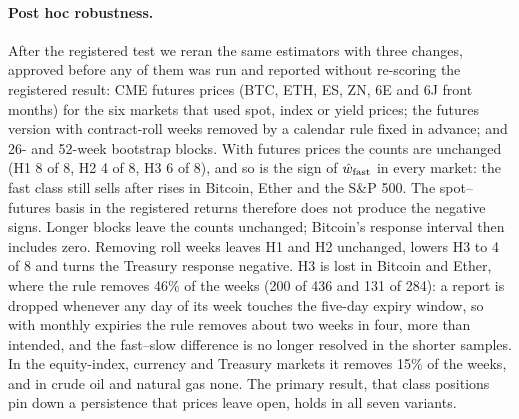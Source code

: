 \paragraph{Post hoc robustness.} After the registered test we reran the same estimators with three changes, approved before any of them was run and reported without re-scoring the registered result: CME futures prices (BTC, ETH, ES, ZN, 6E and 6J front months) for the six markets that used spot, index or yield prices; the futures version with contract-roll weeks removed by a calendar rule fixed in advance; and 26- and 52-week bootstrap blocks. With futures prices the counts are unchanged (H1 8 of 8, H2 4 of 8, H3 6 of 8), and so is the sign of $\hat w_{\rm fast}$ in every market: the fast class still sells after rises in Bitcoin, Ether and the S\&P 500. The spot--futures basis in the registered returns therefore does not produce the negative signs. Longer blocks leave the counts unchanged; Bitcoin's response interval then includes zero. Removing roll weeks leaves H1 and H2 unchanged, lowers H3 to 4 of 8 and turns the Treasury response negative. H3 is lost in Bitcoin and Ether, where the rule removes 46\% of the weeks (200 of 436 and 131 of 284): a report is dropped whenever any day of its week touches the five-day expiry window, so with monthly expiries the rule removes about two weeks in four, more than intended, and the fast--slow difference is no longer resolved in the shorter samples. In the equity-index, currency and Treasury markets it removes 15\% of the weeks, and in crude oil and natural gas none. The primary result, that class positions pin down a persistence that prices leave open, holds in all seven variants.

